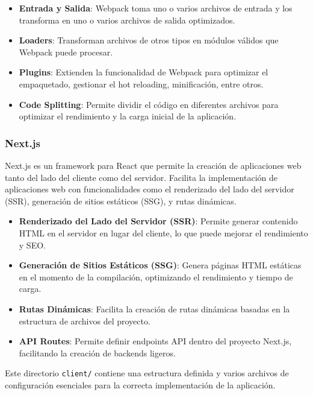 \begin{itemize}
    \item \textbf{Entrada y Salida}: Webpack toma uno o varios archivos de entrada y los transforma en uno o varios archivos de salida optimizados.
    \item \textbf{Loaders}: Transforman archivos de otros tipos en módulos válidos que Webpack puede procesar.
    \item \textbf{Plugins}: Extienden la funcionalidad de Webpack para optimizar el empaquetado, gestionar el hot reloading, minificación, entre otros.
    \item \textbf{Code Splitting}: Permite dividir el código en diferentes archivos para optimizar el rendimiento y la carga inicial de la aplicación.
\end{itemize}

\subsubsection{Next.js}
Next.js es un framework para React que permite la creación de aplicaciones web tanto del lado del cliente como del servidor. Facilita la implementación de aplicaciones web con funcionalidades como el renderizado del lado del servidor (SSR), generación de sitios estáticos (SSG), y rutas dinámicas.

\begin{itemize}
    \item \textbf{Renderizado del Lado del Servidor (SSR)}: Permite generar contenido HTML en el servidor en lugar del cliente, lo que puede mejorar el rendimiento y SEO.
    \item \textbf{Generación de Sitios Estáticos (SSG)}: Genera páginas HTML estáticas en el momento de la compilación, optimizando el rendimiento y tiempo de carga.
    \item \textbf{Rutas Dinámicas}: Facilita la creación de rutas dinámicas basadas en la estructura de archivos del proyecto.
    \item \textbf{API Routes}: Permite definir endpoints API dentro del proyecto Next.js, facilitando la creación de backends ligeros.
\end{itemize}

Este directorio \texttt{client/} contiene una estructura definida y varios archivos de configuración esenciales para la correcta implementación de la aplicación.

